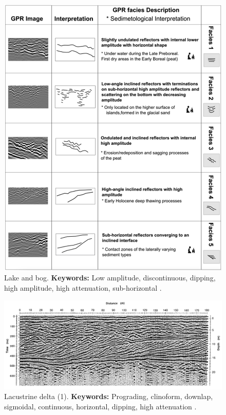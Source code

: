 \begin{figure}[h!]
    \centering
    \includegraphics[width=0.9\linewidth]{Figures/0.2GPR/Corradini_2023_lake_bog.png}
    \caption[Lake and bog.]{Lake and bog. \textbf{Keywords: } Low amplitude, discontinuous, dipping, high amplitude, high attenuation, sub-horizontal \citep{Corradini2023}.}
    \label{fig:Corradini2023-1}
\end{figure}

\begin{figure}[h!]
    \centering
    \includegraphics[width=0.9\linewidth]{Figures/0.2GPR/Jol1991_1.png}
    \caption[Lacustrine delta (1).]{Lacustrine delta (1). \textbf{Keywords: } Prograding, clinoform, downlap, sigmoidal, continuous, horizontal, dipping, high attenuation \citep{Jol1991-1}.}
    \label{fig:Jol1991-1}
\end{figure}

